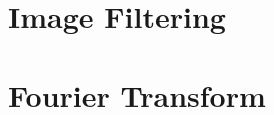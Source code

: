 \documentclass[12pt]{report}
\numberwithin{figure}{chapter}
\begin{document}
\tableofcontents

\newpage
\chapter{Image Filtering}
\newpage


\chapter{Fourier Transform}
\newpage
\end{document}

